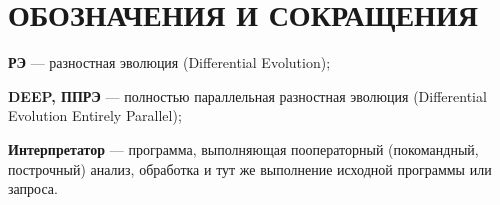 \chapter*{ОБОЗНАЧЕНИЯ И СОКРАЩЕНИЯ}

\textbf{РЭ} --- разностная эволюция (Differential Evolution);

\textbf{DEEP, ППРЭ} --- полностью параллельная разностная эволюция (Differential Evolution Entirely Parallel);

\textbf{Интерпретатор} --- программа, выполняющая пооператорный (покомандный, построчный) анализ, обработка и тут же выполнение исходной программы или запроса.

